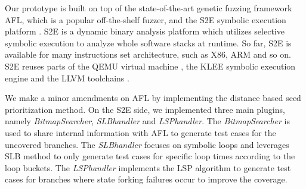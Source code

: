 Our prototype is built on top of the state-of-the-art genetic fuzzing framework AFL, which is a popular off-the-shelf fuzzer, and the S2E symbolic execution platform \cite{chipounov2011s2e}. S2E is a dynamic binary analysis platform which utilizes selective symbolic execution to analyze whole software stacks at runtime. So far, S2E is available for many instructions set architecture, such as X86, ARM and so on. S2E reuses parts of the QEMU virtual machine \cite{bellard2005qemu}, the KLEE symbolic execution engine \cite{cadar2008klee} and the LLVM toolchains \cite{lattner2004llvm}.

We make a minor amendments on AFL by implementing the distance based seed prioritization method. On the S2E side, we implemented three main plugins, namely \textit{BitmapSearcher}, \textit{SLBhandler} and \textit{LSPhandler}. The \textit{BitmapSearcher} is used to share internal information with AFL to generate test cases for the uncovered branches. The \textit{SLBhandler} focuses on symbolic loops and leverages SLB method to only generate test cases for specific loop times according to the loop buckets. The \textit{LSPhandler} implements the LSP algorithm to generate test cases for branches where state forking failures occur to improve the coverage.

